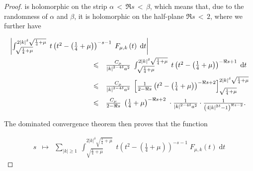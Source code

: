 \documentclass{jams-l}
\theoremstyle{definition}
\theoremstyle{remark}
\numberwithin{equation}{section}
\begin{document}
\begin{proof}
                \noindent is holomorphic on the strip $\alpha \, < \, \Re s \, < \, \beta$, which means that, due to the randomness of $\alpha$ and $\beta$, it is holomorphic on the half-plane $\Re s \, < \, 2$, where we further have
            
                \[ \begin{array}{lll}
                        \multicolumn{3}{l}{\left \vert \int_{\sqrt{\frac{1}{4}+\mu}}^{2 \left \vert k \right \vert^{\delta} \sqrt{\frac{1}{4}+\mu}} \; t \left( t^2 - \left( \frac{1}{4}+\mu \right) \right)^{-s-1} \; F_{\mu,k} \left( t \right) \; \text{d}t \right \vert} \\[1em]
                    
                        \qquad \qquad \qquad \qquad \qquad \quad & \leqslant & \frac{C_{\mu}}{\left \vert k \right \vert^{2-4\delta} a^2} \; \int_{\sqrt{\frac{1}{4}+\mu}}^{2 \left \vert k \right \vert^{\delta} \sqrt{\frac{1}{4}+\mu}} \; t \left( t^2 - \left( \frac{1}{4}+\mu \right) \right)^{- \Re s +1} \; \text{d}t \\[1em]
                    
                        & \leqslant & \frac{C_{\mu}}{\left \vert k \right \vert^{2-4\delta} a^2} \; \left[ \frac{1}{2 - \Re s} \left( t^2 - \left( \frac{1}{4}+\mu \right) \right)^{-\Re s + 2} \right]_{\sqrt{\frac{1}{4}+\mu}}^{2 \left \vert k \right \vert^{\delta} \sqrt{\frac{1}{4}+\mu}} \\[1em]
                    
                        & \leqslant & \frac{C_{\mu}}{2 - \Re s} \; \left( \frac{1}{4} + \mu \right)^{- \Re s + 2} \; \cdot \frac{1}{\left \vert k \right \vert^{2-4\delta} a^2} \cdot \frac{1}{\left( 4 \left \vert k \right \vert^{2 \delta} - 1 \right)^{\Re s - 2}}.
                    \end{array} \]
            
                \noindent The dominated convergence theorem then proves that the function
            
                \[ \begin{array}{ccc}
                        \displaystyle s & \longmapsto & \displaystyle \sum\limits_{\left \vert k \right \vert \geqslant 1} \; \int_{\sqrt{\frac{1}{4}+\mu}}^{2 \left \vert k \right \vert^{\delta} \sqrt{\frac{1}{4}+\mu}} \; t \left( t^2 - \left( \frac{1}{4}+\mu \right) \right)^{-s-1} \; F_{\mu,k} \left( t \right) \; \text{d}t
                    \end{array} \]
            

\end{proof}
\end{document}
